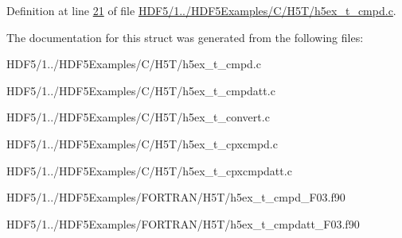Definition at line \hyperlink{_h_d_f5_21_810_81_2_h_d_f5_examples_2_c_2_h5_t_2h5ex__t__cmpd_8c_source_l00021}{21} of file \hyperlink{_h_d_f5_21_810_81_2_h_d_f5_examples_2_c_2_h5_t_2h5ex__t__cmpd_8c_source}{H\+D\+F5/1../\+H\+D\+F5\+Examples/\+C/\+H5\+T/h5ex\+\_\+t\+\_\+cmpd.\+c}.



The documentation for this struct was generated from the following files\+:\begin{DoxyCompactItemize}
\item 
H\+D\+F5/1../\+H\+D\+F5\+Examples/\+C/\+H5\+T/h5ex\+\_\+t\+\_\+cmpd.\+c\item 
H\+D\+F5/1../\+H\+D\+F5\+Examples/\+C/\+H5\+T/h5ex\+\_\+t\+\_\+cmpdatt.\+c\item 
H\+D\+F5/1../\+H\+D\+F5\+Examples/\+C/\+H5\+T/h5ex\+\_\+t\+\_\+convert.\+c\item 
H\+D\+F5/1../\+H\+D\+F5\+Examples/\+C/\+H5\+T/h5ex\+\_\+t\+\_\+cpxcmpd.\+c\item 
H\+D\+F5/1../\+H\+D\+F5\+Examples/\+C/\+H5\+T/h5ex\+\_\+t\+\_\+cpxcmpdatt.\+c\item 
H\+D\+F5/1../\+H\+D\+F5\+Examples/\+F\+O\+R\+T\+R\+A\+N/\+H5\+T/h5ex\+\_\+t\+\_\+cmpd\+\_\+\+F03.\+f90\item 
H\+D\+F5/1../\+H\+D\+F5\+Examples/\+F\+O\+R\+T\+R\+A\+N/\+H5\+T/h5ex\+\_\+t\+\_\+cmpdatt\+\_\+\+F03.\+f90\end{DoxyCompactItemize}
